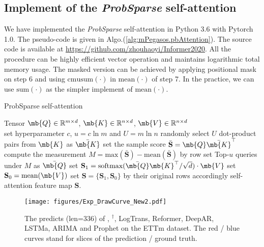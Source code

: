 \begin{appendices}
\subsection{Implement of the \emph{ProbSparse} self-attention}
\label{sec:appendix.algo}
We have implemented the \emph{ProbSparse} self-attention in Python 3.6 with Pytorch 1.0. The pseudo-code is given in Algo.(\ref{alg:mPegasos.pbAttention}). The source code is available at \url{https://github.com/zhouhaoyi/Informer2020}. All the procedure can be highly efficient vector operation and maintains logarithmic total memory usage. The masked version can be achieved by applying positional mask on step 6 and using $\textrm{cmusum}(\cdot)$ in $\textrm{mean}(\cdot)$ of step 7. In the practice, we can use $\textrm{sum}(\cdot)$ as the simpler implement of $\textrm{mean}(\cdot)$.

\begin{algorithm}[ht]
\caption{ProbSparse self-attention}
\label{alg:mPegasos.pbAttention}
\begin{algorithmic}[1]
\small
\REQUIRE
Tensor $\mb{Q}\in \mathbb{R}^{m \times d}$, $\mb{K}\in \mathbb{R}^{n \times d}$, $\mb{V}\in \mathbb{R}^{n \times d}$\\
\PRINT set hyperparameter $c$, $u= c \ln m$ and $U= m \ln n$
\STATE randomly select $U$ dot-product pairs from $\mb{K}$ as $\bar{\mb{K}}$
\STATE set the sample score $\bar{\mathbf{S}} = \mb{Q} \bar{\mb{K}}^{\top}$
\STATE compute the measurement $M= \textrm{max} (\bar{\mathbf{S}}) - \textrm{mean} (\bar{\mathbf{S}})$ by row
\STATE set Top-$u$ queries under $M$ as $\bar{\mb{Q}}$
\STATE set $\mathbf{S}_1 = \textrm{softmax}(\bar{\mb{Q}} \mb{K}^{\top} / \sqrt{d}) \cdot \mb{V}$
\STATE set $\mathbf{S}_0 = \textrm{mean}(\mb{V})$
\STATE set $\mathbf{S} = \{\mathbf{S}_1,\mathbf{S}_0\}$ by their original rows accordingly
\ENSURE
self-attention feature map $\mathbf{S}$. \\
\end{algorithmic}
\end{algorithm}

\begin{figure*}[t]
  \centering
  \texttt{[image: figures/Exp\_DrawCurve\_New2.pdf]}
  \caption{The predicts (len=336) of \mn, \mn$^{\dag}$, LogTrans, Reformer, DeepAR, LSTMa, ARIMA and Prophet on the ETTm dataset. The red / blue curves stand for slices of the prediction / ground truth.}
  \label{fig:appendix.exp.curve}
\end{figure*}


\end{appendices}

